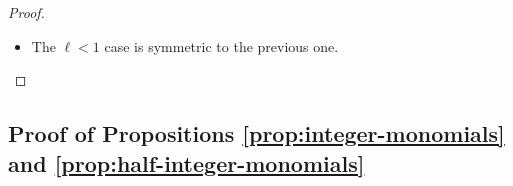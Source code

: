 \documentclass[12pt,oneside,english]{amsart}
\numberwithin{equation}{section}
\numberwithin{figure}{section}
\theoremstyle{plain}
\theoremstyle{plain}
\theoremstyle{plain}
\theoremstyle{plain}
\theoremstyle{remark}
\theoremstyle{definition}
\theoremstyle{plain}
\theoremstyle{plain}
\numberwithin{thm}{section}
\newcommand{\kallemod}[1]{{\color{kallecol} {#1}}}
\begin{document}
\begin{proof}
\begin{itemize}
\begin{itemize}
\begin{itemize}
is clear by discrete holomorphicity of~$\dmon{z_{\dmd}}{k}$ 
and~$\dmonavg{z_{\mdl}}{\ell}$.
\item For $k=-1$ and $k=-2$ and any $\ell \geq 3-k$ we have that 
$\dmonavg{z_{\mdl}}{\ell}$ vanishes on each of the medial vertices 
where $\ddeebar \dmon{z_{\dmd}}{k}$ is non-zero, so the vanishing of the 
contour integral follows from Stokes' formula.
\item For $k<-2$ we can integrate by parts an even number of times to 
reduce to the previous case.
\end{itemize}
\item For half-integer $k,\ell$,
we can use two integrations by parts (on a large enough contour,
where both $z_{\dmd}^{\left[k\right]}$ at $z_{\mdl}^{\{\ell\} }$
are discrete holomorphic) to raise the power of $k$ by $2$ units
while decreasing the power of $\ell$ by $2$ units, keeping $k+\ell$
constant and $\ell\geq0$ until $k\geq1$, and reduce this case to
the previous one (the reason we use two integrations by parts is to
keep the functions on the same lattices: 
$\ddee \ddee z_{\dmd}^{\left[k+2\right]}
= (k+2) (k+1) z_{\dmd}^{\left[k\right]}$
and $\ddee \ddee z_{\mdl}^{\{\ell+2\}}
= (\ell+2) (\ell+1)
    z_{\mdl}^{\{\ell\} }$).
\end{itemize}
\item The $\ell<1$ case is symmetric to the previous one.
\end{itemize}
\end{proof}

\subsection{\label{subsec:proof-of-propositions-discrete-monomials}Proof of
Propositions \ref{prop:integer-monomials} and \ref{prop:half-integer-monomials}}
\end{document}
